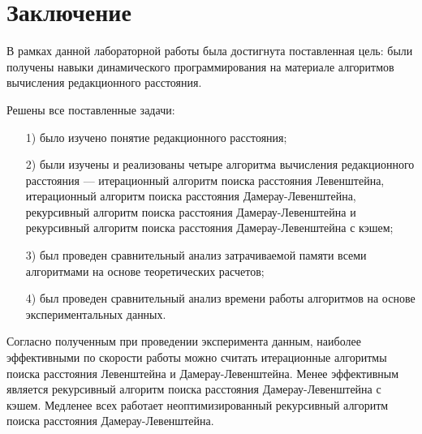 {\center\chapter*{Заключение}}

В рамках данной лабораторной работы была достигнута поставленная цель: были получены навыки динамического программирования на материале алгоритмов вычисления редакционного расстояния.

Решены все поставленные задачи:

\begin{enumerate}
\item[1)] было изучено понятие редакционного расстояния;
\item[2)] были изучены и реализованы четыре алгоритма вычисления редакционного расстояния --- итерационный алгоритм поиска расстояния Левенштейна, итерационный алгоритм поиска расстояния Дамерау-Левенштейна, рекурсивный алгоритм поиска расстояния Дамерау-Левенштейна и рекурсивный алгоритм поиска расстояния Дамерау-Левенштейна с кэшем;
\item[3)] был проведен сравнительный анализ затрачиваемой памяти всеми алгоритмами на основе теоретических расчетов;
\item[4)]
был проведен сравнительный анализ времени работы алгоритмов на основе экспериментальных данных.
\end{enumerate}

Согласно полученным при проведении эксперимента данным, наиболее эффективными по скорости работы можно считать итерационные алгоритмы поиска расстояния Левенштейна и Дамерау-Левенштейна. 
Менее эффективным является рекурсивный алгоритм поиска расстояния Дамерау-Левенштейна с кэшем. 
Медленее всех работает неоптимизированный рекурсивный алгоритм поиска расстояния Дамерау-Левенштейна.
